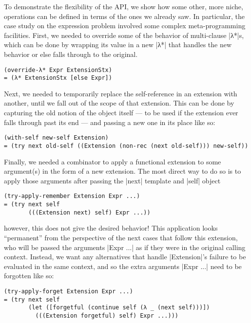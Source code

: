 To demonstrate the flexibility of the API, we show how some other, more niche, operations can be defined in terms of the ones we already saw.
In particular, the case study on the expression problem involved some complex meta-programming facilities.
First, we needed to override some of the behavior of multi-clause \scm|λ*|s, which can be done by wrapping its value in a new \scm|λ*| that handles the new behavior or else falls through to the original.
\begin{verbatim}
(override-λ* Expr ExtensionStx)
= (λ* ExtensionStx [else Expr])
\end{verbatim}
Next, we needed to temporarily replace the self-reference in an extension with another, until we fall out of the scope of that extension.
This can be done by capturing the old notion of the object itself --- to be used if the extension ever falls through past its end --- and passing a new one in its place like so:
\begin{verbatim}
(with-self new-self Extension)
= (try next old-self ((Extension (non-rec (next old-self))) new-self))
\end{verbatim}
Finally, we needed a combinator to apply a functional extension to some argument(s) in the form of a new extension.
The most direct way to do so is to apply those arguments after passing the \scm|next| template and \scm|self| object
\begin{verbatim}
(try-apply-remember Extension Expr ...)
= (try next self
       (((Extension next) self) Expr ...))
\end{verbatim}
however, this does not give the desired behavior!
This application looks ``permanent'' from the perspective of the next cases that follow this extension, who will be passed the arguments \scm|Expr ...| as if they were in the original calling context.
Instead, we want any alternatives that handle \scm|Extension|'s failure to be evaluated in the same context, and so the extra arguments \scm|Expr ...| need to be forgotten like so:
\begin{verbatim}
(try-apply-forget Extension Expr ...)
= (try next self
       (let ([forgetful (continue self (λ _ (next self)))])
         (((Extension forgetful) self) Expr ...)))
\end{verbatim}



